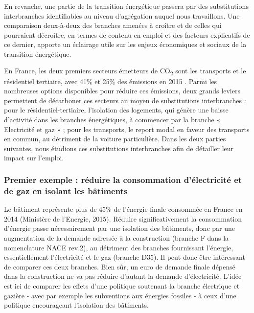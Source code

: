 En revanche, une partie de la transition énergétique passera par des substitutions interbranches identifiables au niveau d’agrégation auquel nous travaillons. Une comparaison deux-à-deux des branches amenées à croître et de celles qui pourraient décroître, en termes de contenu en emploi et des facteurs explicatifs de ce dernier, apporte un éclairage utile sur les enjeux économiques et sociaux de la transition énergétique. 

En France, les deux premiers secteurs émetteurs de CO\textsubscript{2} sont les transports et le résidentiel tertiaire, avec 41\% et 25\% des émissions en 2015 \citep{Dussud2016}. 
Parmi les nombreuses options disponibles pour réduire ces émissions, deux grands leviers permettent de décarboner ces secteurs au moyen de substitutions interbranches
: pour le résidentiel-tertiaire, l’isolation des logements, qui génère une baisse d’activité dans les branches énergétiques, à commencer par la branche « Electricité et gaz » ; pour les transports, le report modal en faveur des transports en commun, au détriment de la voiture particulière.
Dans les deux parties suivantes, nous étudions ces substitutions interbranches afin de détailler leur impact sur l'emploi. 

\subsubsection{Premier exemple : réduire la consommation d'électricité et de gaz en isolant les bâtiments}

Le bâtiment représente plus de 45\% de l’énergie finale consommée en France en 2014 (Ministère de l’Energie, 2015). Réduire significativement la consommation d’énergie passe nécessairement par une isolation des bâtiments, donc par une augmentation de la demande adressée à la construction (branche F dans la nomenclature NACE rev.2), au détriment des branches fournissant l’énergie, essentiellement l’électricité et le gaz (branche D35). Il peut donc être intéressant de comparer ces deux branches. Bien sûr, un euro de demande finale dépensé dans la construction ne va pas réduire d’autant la demande d’électricité. L’idée est ici de comparer les effets d’une politique soutenant la branche électrique et gazière - avec par exemple les subventions aux énergies fossiles \citep{OCDE2015} - à ceux d’une politique encourageant l'isolation des bâtiments. 

